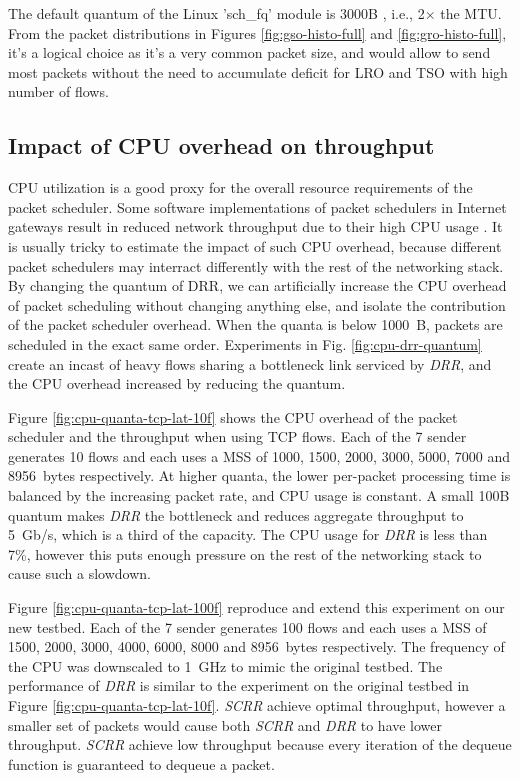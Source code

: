 The default quantum of the Linux 'sch\_fq' module is 3000B
\cite{sch-fq}, i.e., 2$\times$ the MTU. From the packet distributions
in Figures \ref{fig:gso-histo-full} and \ref{fig:gro-histo-full}, it's
a logical choice as it's a very common packet size, and would allow to
send most packets without the need to accumulate deficit for LRO and
TSO with high number of flows.




\subsection{Impact of CPU overhead on throughput}
\label{app:eval-fairness}

CPU utilization is a good proxy for the overall resource
requirements of the packet scheduler. Some software implementations of
packet schedulers in Internet gateways result in reduced network
throughput due to their high CPU usage \cite{cake-perf1,
  cake-perf2}. It is usually tricky to estimate the impact of such CPU
overhead, because different packet schedulers may interract
differently with the rest of the networking stack. By changing the
quantum of DRR, we can artificially increase the CPU overhead of
packet scheduling without changing anything else, and isolate the
contribution of the packet scheduler overhead. When the quanta is
below 1000~B, packets are scheduled in the exact same
order. Experiments in Fig. \ref{fig:cpu-drr-quantum} create an incast
of heavy flows sharing a bottleneck link serviced by \textit{DRR}, and
the CPU overhead increased by reducing the quantum.


Figure \ref{fig:cpu-quanta-tcp-lat-10f} shows the CPU overhead of the
packet scheduler and the throughput when using TCP flows.  Each of the
7 sender generates 10 flows and each uses a MSS of 1000, 1500, 2000,
3000, 5000, 7000 and 8956~bytes respectively. At higher quanta, the
lower per-packet processing time is balanced by the increasing packet
rate, and CPU usage is constant. A small 100B quantum makes
\textit{DRR} the bottleneck and reduces aggregate throughput to
5~Gb/s, which is a third of the capacity. The CPU usage for
\textit{DRR} is less than 7\%, however this puts enough pressure on
the rest of the networking stack to cause such a slowdown.


Figure \ref{fig:cpu-quanta-tcp-lat-100f} reproduce and extend this
experiment on our new testbed. Each of the 7 sender generates 100
flows and each uses a MSS of 1500, 2000, 3000, 4000, 6000, 8000 and
8956~bytes respectively. The frequency of the CPU was downscaled to
1~GHz to mimic the original testbed. The performance of \textit{DRR}
is similar to the experiment on the original testbed in
Figure \ref{fig:cpu-quanta-tcp-lat-10f}. \textit{SCRR} achieve optimal
throughput, however a smaller set of packets would cause both
\textit{SCRR} and \textit{DRR} to have lower throughput. \textit{SCRR}
achieve low throughput because every iteration of the dequeue function
is guaranteed to dequeue a packet.

